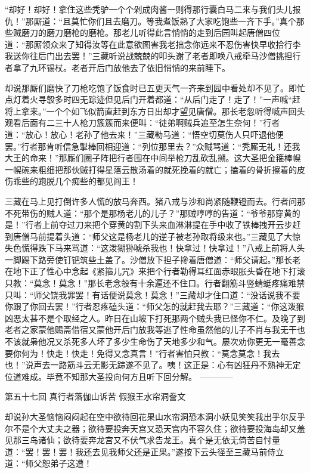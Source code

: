 \documentclass[12pt,UTF8]{ctexbook}
\begin{document}
“却好！却好！拿住这些秃驴一个个剁成肉酱一则得那行囊白马二来与我们头儿报仇！”那厮道：“且莫忙你们且去磨刀。等我煮饭熟了大家吃饱些一齐下手。”真个那些贼磨刀的磨刀磨枪的磨枪。那老儿听得此言悄悄的走到后园叫起唐僧四位道：“那厮领众来了知得汝等在此意欲图害我老拙念你远来不忍伤害快早收拾行李我送你往后门出去罢！”三藏听说战兢兢的叩头谢了老者即唤八戒牵马沙僧挑担行者拿了九环锡杖。老者开后门放他去了依旧悄悄的来前睡下。

却说那厮们磨快了刀枪吃饱了饭食时已五更天气一齐来到园中看处却不见了。即忙点灯着火寻彀多时四无踪迹但见后门开着都道：“从后门走了！走了！”一声喊“赶将上拿来。”一个个如飞似箭直赶到东方日出却才望见唐僧。那长老忽听得喊声回头观看后面有二三十人枪刀簇簇而来便叫：“徒弟啊贼兵追至怎生奈何！”行者道：“放心！放心！老孙了他去来！”三藏勒马道：“悟空切莫伤人只吓退他便罢。”行者那肯听信急掣棒回相迎道：“列位那里去？”众贼骂道：“秃厮无礼！还我大王的命来！”那厮们圈子阵把行者围在中间举枪刀乱砍乱搠。这大圣把金箍棒幌一幌碗来粗细把那伙贼打得星落云散汤着的就死挽着的就亡；搕着的骨折擦着的皮伤乖些的跑脱几个痴些的都见阎王！

三藏在马上见打倒许多人慌的放马奔西。猪八戒与沙和尚紧随鞭镫而去。行者问那不死带伤的贼人道：“那个是那杨老儿的儿子？”那贼哼哼的告道：“爷爷那穿黄的是！”行者上前夺过刀来把个穿黄的割下头来血淋淋提在手中收了铁棒拽开云步赶到唐僧马前提着头道：“师父这是杨老儿的逆子被老孙取将级来也。”三藏见了大惊失色慌得跌下马来骂道：“这泼猢狲唬杀我也！快拿过！快拿过！”八戒上前将人头一脚踢下路旁使钉钯筑些土盖了。沙僧放下担子搀着唐僧道：“师父请起。”那长老在地下正了性心中念起《紧箍儿咒》来把个行者勒得耳红面赤眼胀头昏在地下打滚只教：“莫念！莫念！”那长老念彀有十余遍还不住口。行者翻筋斗竖蜻蜓疼痛难禁只叫：“师父饶我罪罢！有话便说莫念！莫念！”三藏却才住口道：“没话说我不要你跟了你回去罢！”行者忍疼磕头道：“师父怎的就赶我去耶？”三藏道：“你这泼猴凶恶太甚不是个取经之人。昨日在山坡下打死那两个贼头我已怪你不仁。及晚了到老者之家蒙他赐斋借宿又蒙他开后门放我等逃了性命虽然他的儿子不肖与我无干也不该就枭他况又杀死多人坏了多少生命伤了天地多少和气。屡次劝你更无一毫善念要你何为！快走！快走！免得又念真言！”行者害怕只教：“莫念莫念！我去也！”说声去一路筋斗云无影无踪遂不见了。咦！这正是：心有凶狂丹不熟神无定位道难成。毕竟不知那大圣投向何方且听下回分解。
------------

第五十七回 真行者落伽山诉苦 假猴王水帘洞誊文

却说孙大圣恼恼闷闷起在空中欲待回花果山水帘洞恐本洞小妖见笑笑我出乎尔反乎尔不是个大丈夫之器；欲待要投奔天宫又恐天宫内不容久住；欲待要投海岛却又羞见那三岛诸仙；欲待要奔龙宫又不伏气求告龙王。真个是无依无倚苦自忖量道：“罢！罢！罢！我还去见我师父还是正果。”遂按下云头径至三藏马前侍立道：“师父恕弟子这遭！
\end{document}
